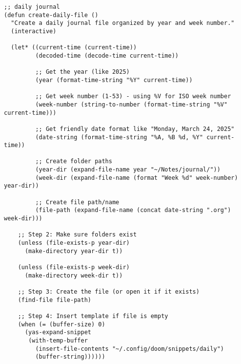 \documentclass[11pt]{article}
\begin{document}
\begin{verbatim}
;; daily journal
(defun create-daily-file ()
  "Create a daily journal file organized by year and week number."
  (interactive)

  (let* ((current-time (current-time))
         (decoded-time (decode-time current-time))

         ;; Get the year (like 2025)
         (year (format-time-string "%Y" current-time))

         ;; Get week number (1-53) - using %V for ISO week number
         (week-number (string-to-number (format-time-string "%V" current-time)))

         ;; Get friendly date format like "Monday, March 24, 2025"
         (date-string (format-time-string "%A, %B %d, %Y" current-time))

         ;; Create folder paths
         (year-dir (expand-file-name year "~/Notes/journal/"))
         (week-dir (expand-file-name (format "Week %d" week-number) year-dir))

         ;; Create file path/name
         (file-path (expand-file-name (concat date-string ".org") week-dir)))

    ;; Step 2: Make sure folders exist
    (unless (file-exists-p year-dir)
      (make-directory year-dir t))

    (unless (file-exists-p week-dir)
      (make-directory week-dir t))

    ;; Step 3: Create the file (or open it if it exists)
    (find-file file-path)

    ;; Step 4: Insert template if file is empty
    (when (= (buffer-size) 0)
      (yas-expand-snippet
       (with-temp-buffer
         (insert-file-contents "~/.config/doom/snippets/daily")
         (buffer-string))))))
\end{verbatim}
\end{document}
